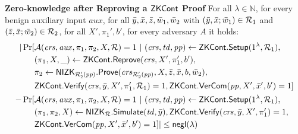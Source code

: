 \noindent \textbf{Zero-knowledge after Reproving a ${\mathsf{ZKCont}}$ Proof} For all $\lambda \in \mathbb{N}$, for every benign auxiliary input $aux$, 
for all $\bar{y},\bar{x},\bar{z}, \bar{w}_1, \bar{w}_2$ with $(\bar{y}, \bar{x}; \bar{w}_1) \in \mathcal{R}_1$ and $(\bar{z}, \bar{x}; \bar{w}_2) \in \mathcal{R}_2$, for all $X',\pi_1', b'$, for every adversary $A$ it holds:
{\begin{align*}
| \Pr[& \mathcal{A}(\mathit{crs}, \mathit{aux}, \pi_1,\pi_2, X, \mathcal{R}) = 1 \ | \ (\mathit{crs}, \mathit{td}, \mathit{pp}) \leftarrow {\ensuremath{\mathsf{ZKCont}}}.{\mathsf{Setup}} (1^{\lambda}, \mathcal{R}_1), \\
& (\pi_1, X, \_) \leftarrow {\ensuremath{\mathsf{ZKCont}}}.{\mathsf{Reprove}} (\mathit{crs}, X', \pi_1', b'), \\
&\pi_2 \leftarrow {\ensuremath{\mathsf{NIZK_{\mathcal{R}'_2(\mathit{pp})}}}}.{\mathsf{Prove}}(\mathit{crs}_{\mathcal{R}'_2(\mathit{pp})}, X, \bar{z}, \bar{x}, b, \bar{w}_2), \\
& {\mathsf{ZKCont}}.{\mathsf{Verify}}(\mathit{crs}, \bar{y}, X', \pi'_1, \mathcal{R}_1) = 1, {\mathsf{ZKCont}}.{\mathsf{VerCom}}(\mathit{pp}, X', \bar{x}', b') = 1]  \\
- \Pr[& \mathcal{A}(\mathit{crs}, \mathit{aux}, \pi_1,\pi_2, X, \mathcal{R}) = 1 \ | \ (\mathit{crs}, \mathit{td}, \mathit{pp}) \leftarrow {\ensuremath{\mathsf{ZKCont}}}.{\mathsf{Setup}} (1^{\lambda}, \mathcal{R}_1), \\ 
& (\pi_1,\pi_2, X) \leftarrow {\ensuremath{\mathsf{NIZK_{\mathcal{R}}}}}.{\mathsf{Simulate}}(\mathit{td}, \bar{y}), {\mathsf{ZKCont}}.{\mathsf{Verify}}(\mathit{crs}, \bar{y}, X', \pi'_1) = 1, \\
& {\mathsf{ZKCont}}.{\mathsf{VerCom}}(\mathit{pp}, X', \bar{x}', b') = 1]| \leq \mathsf{negl}(\lambda)
\end{align*}}

